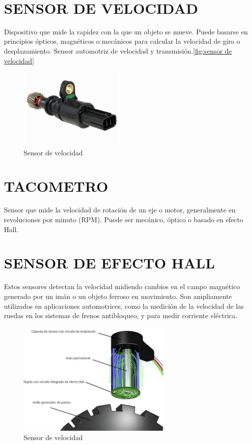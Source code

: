 \\
\newpage
\section{SENSOR DE VELOCIDAD}
Dispositivo que mide la rapidez con la que un objeto se mueve. Puede basarse en principios ópticos, magnéticos o mecánicos para calcular la velocidad de giro o desplazamiento.
Sensor automotriz de velocidad y transmisión.\autoref{fig:sensor de velocidad}
\begin{figure}[h]
	\centering
	\includegraphics[width=0.3\linewidth]{img/sensor de velocidad}
	\caption{Sensor de velocidad}
	\label{fig:sensor de velocidad}
\end{figure}

\section*{TACOMETRO}
Sensor que mide la velocidad de rotación de un eje o motor, generalmente en revoluciones por minuto (RPM). Puede ser mecánico, óptico o basado en efecto Hall.

\section*{SENSOR DE EFECTO HALL}
Estos sensores detectan la velocidad midiendo cambios en el campo magnético generado por un imán o un objeto ferroso en movimiento. Son ampliamente utilizados en aplicaciones automotrices, como la medición de la velocidad de las ruedas en los sistemas de frenos antibloqueo, y para medir corriente eléctrica.

\begin{figure}[h]
	\centering
	\includegraphics[width=0.3\linewidth]{img/HALL}
	\caption{Sensor de velocidad}
	\label{fig:HALL}
\end{figure}


